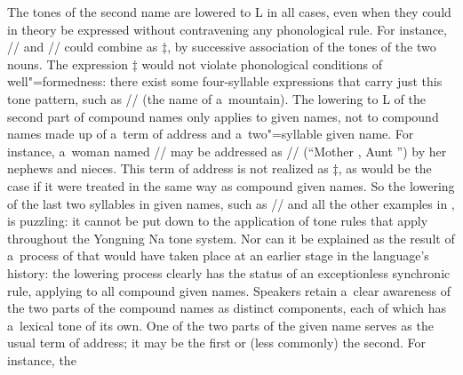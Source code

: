 
The tones of the second name are lowered to L in all cases, even when they could in theory be expressed without contravening any {phonological rule}. For instance, // and // could combine as $\ddagger${\kern2pt}, by successive association of the tones of the two nouns. The expression $\ddagger${\kern2pt} would not violate phonological conditions of well"=formedness: there exist some four-syllable expressions that carry just this tone pattern, such as // (the name of a~mountain). The lowering to L of the second part of compound names only applies to given names, not to compound names made up of a~term of address and a~two"=syllable given name. For instance, a~woman named // may be addressed as // (“Mother , Aunt ”) by her nephews and nieces. This term of address is not realized as $\ddagger${\kern2pt}, as would be the case if it were treated in the same way as compound given names. So the lowering of the last two syllables in given names, such as // and all the other examples in , is puzzling: it cannot be put down to the application of tone rules that apply throughout the Yongning Na tone system. Nor can it be explained as the result of a~process of  that would have taken place at an earlier stage in the language's history: the lowering process clearly has the status of an exceptionless synchronic rule, applying to all compound given names. Speakers retain a~clear awareness of the two parts of the compound names as distinct components, each of which has a~lexical tone of its own. One of the two parts of the given name serves as the usual term of address; it may be the first or (less commonly) the second. For instance, the 
